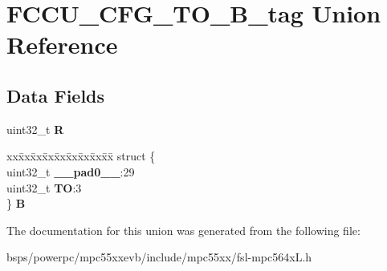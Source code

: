 \hypertarget{unionFCCU__CFG__TO__32B__tag}{}\section{F\+C\+C\+U\+\_\+\+C\+F\+G\+\_\+\+T\+O\+\_\+B\+\_\+tag Union Reference}
\label{unionFCCU__CFG__TO__32B__tag}
\subsection*{Data Fields}
\begin{DoxyCompactItemize}
\item 
\mbox{\label{unionFCCU__CFG__TO__32B__tag_a72394e43c5aaec5b0b7e6777ada37638}} 
uint32\+\_\+t {\bfseries R}
\item 
\mbox{\label{unionFCCU__CFG__TO__32B__tag_a092951c0dfb938a3c1edcdcfb9f496f4}} 
\begin{tabbing}
xx\=xx\=xx\=xx\=xx\=xx\=xx\=xx\=xx\=\kill
struct \{\\
\>uint32\_t {\bfseries \_\_pad0\_\_}:29\\
\>uint32\_t {\bfseries TO}:3\\
\} {\bfseries B}\\

\end{tabbing}\end{DoxyCompactItemize}


The documentation for this union was generated from the following file\+:\begin{DoxyCompactItemize}
\item 
bsps/powerpc/mpc55xxevb/include/mpc55xx/fsl-\/mpc564x\+L.\+h\end{DoxyCompactItemize}
